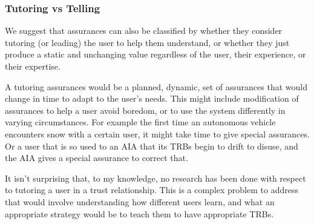 \subsubsection{Tutoring vs Telling} \label{sec:teach_tell}
    We suggest that assurances can also be classified by whether they consider tutoring (or leading) the user to help them understand, or whether they just produce a static and unchanging value regardless of the user, their experience, or their expertise.

    A tutoring assurances would be a planned, dynamic, set of assurances that would change in time to adapt to the user's needs. This might include modification of assurances to help a user avoid boredom, or to use the system differently in varying circumstances. For example the first time an autonomous vehicle encounters snow with a certain user, it might take time to give special assurances. Or a user that is so used to an AIA that its TRBs begin to drift to disuse, and the AIA gives a special assurance to correct that.

    It isn't surprising that, to my knowledge, no research has been done with respect to tutoring a user in a trust relationship. This is a complex problem to address that would involve understanding how different users learn, and what an appropriate strategy would be to teach them to have appropriate TRBs.
